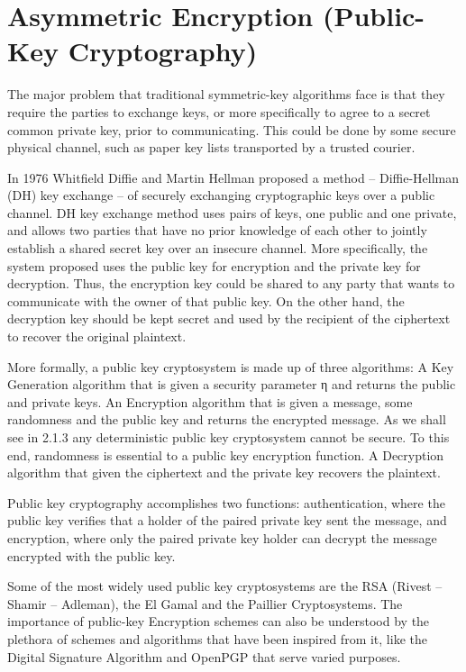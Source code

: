 \section{Asymmetric Encryption (Public-Key Cryptography)}
The major problem that traditional symmetric-key algorithms face is that they require the parties to exchange keys, or more specifically to agree to a secret common private key, prior to communicating.
This could be done by some secure physical channel, such as paper key lists transported by a trusted courier.

In 1976 Whitfield Diffie and Martin Hellman proposed a method – Diffie-Hellman (DH) key exchange – of securely exchanging cryptographic keys over a public channel.
DH key exchange method uses pairs of keys, one public and one private, and allows two parties that have no prior knowledge of each other to jointly establish a shared secret key over an insecure channel. More specifically, the system proposed uses the public key for encryption and the private key for decryption.
Thus, the encryption key could be shared to any party that wants to communicate with the owner of that public key.
On the other hand, the decryption key should be kept secret and used by the recipient of the ciphertext to recover the original plaintext.

More formally, a public key cryptosystem is made up of three algorithms:
A Key Generation algorithm that is given a security parameter η and returns the public and private keys.
An Encryption algorithm that is given a message, some randomness and the public key and returns the encrypted message.
As we shall see in 2.1.3 any deterministic public key cryptosystem cannot be secure. To this end, randomness is essential to a public key encryption function.
A Decryption algorithm that given the ciphertext and the private key recovers the plaintext.

Public key cryptography accomplishes two functions: authentication, where the public key verifies that a holder of the paired private key sent the message, and encryption, where only the paired private key holder can decrypt the message encrypted with the public key.

Some of the most widely used public key cryptosystems are the RSA (Rivest – Shamir – Adleman), the El Gamal and the Paillier Cryptosystems.
The importance of public-key Encryption schemes can also be understood by the plethora of schemes and algorithms that have been inspired from it, like the Digital Signature Algorithm and OpenPGP that serve varied purposes.
